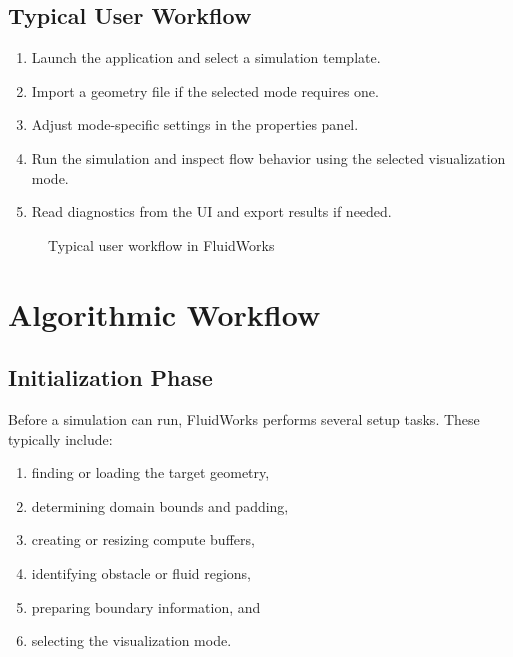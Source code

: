 \documentclass[12pt,a4paper,titlepage]{report}
\begin{document}
\section{Typical User Workflow}
\begin{enumerate}
\item Launch the application and select a simulation template.
\item Import a geometry file if the selected mode requires one.
\item Adjust mode-specific settings in the properties panel.
\item Run the simulation and inspect flow behavior using the selected visualization mode.
\item Read diagnostics from the UI and export results if needed.
\end{enumerate}

\begin{figure}[H]
\centering
{}
\caption{Typical user workflow in FluidWorks}
\label{fig:userworkflow}
\end{figure}

\chapter{Algorithmic Workflow}
\section{Initialization Phase}
Before a simulation can run, FluidWorks performs several setup tasks. These typically include:
\begin{enumerate}
\item finding or loading the target geometry,
\item determining domain bounds and padding,
\item creating or resizing compute buffers,
\item identifying obstacle or fluid regions,
\item preparing boundary information, and
\item selecting the visualization mode.
\end{enumerate}
\end{document}
